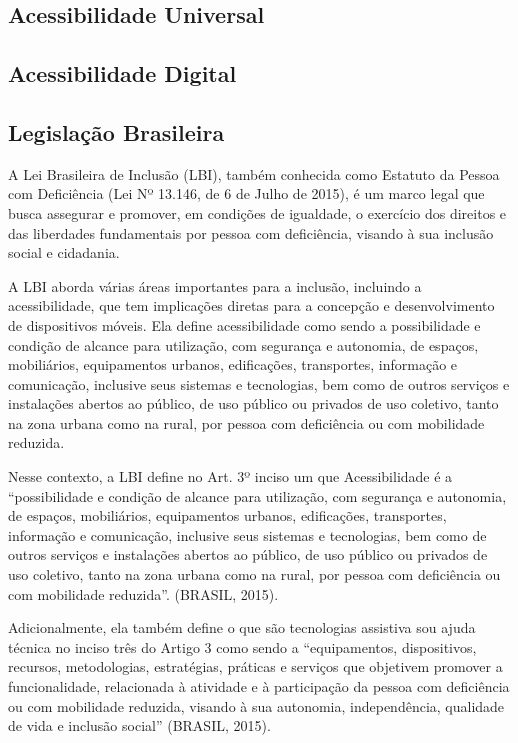 \subsection{Acessibilidade Universal}

\subsection{Acessibilidade Digital}

\subsection{Legislação Brasileira}

A Lei Brasileira de Inclusão (LBI), também conhecida como Estatuto da Pessoa com Deficiência (Lei Nº 13.146, de 6 de Julho de 2015), é um marco legal que busca assegurar e promover, em condições de igualdade, o exercício dos direitos e das liberdades fundamentais por pessoa com deficiência, visando à sua inclusão social e cidadania.

A LBI aborda várias áreas importantes para a inclusão, incluindo a acessibilidade, que tem implicações diretas para a concepção e desenvolvimento de dispositivos móveis. Ela define acessibilidade como sendo a possibilidade e condição de alcance para utilização, com segurança e autonomia, de espaços, mobiliários, equipamentos urbanos, edificações, transportes, informação e comunicação, inclusive seus sistemas e tecnologias, bem como de outros serviços e instalações abertos ao público, de uso público ou privados de uso coletivo, tanto na zona urbana como na rural, por pessoa com deficiência ou com mobilidade reduzida.

Nesse contexto, a LBI define no Art. 3º inciso um que Acessibilidade é a “possibilidade e condição de alcance para utilização, com segurança e autonomia, de espaços, mobiliários, equipamentos urbanos, edificações, transportes, informação e comunicação, inclusive seus sistemas e tecnologias, bem como de outros serviços e instalações abertos ao público, de uso público ou privados de uso coletivo, tanto na zona urbana como na rural, por pessoa com deficiência ou com mobilidade reduzida”. (BRASIL, 2015).

Adicionalmente, ela também define o que são tecnologias assistiva sou ajuda técnica no inciso três do Artigo 3 como sendo a “equipamentos, dispositivos, recursos, metodologias, estratégias, práticas e serviços que objetivem promover a funcionalidade, relacionada à atividade e à participação da pessoa com deficiência ou com mobilidade reduzida, visando à sua autonomia, independência, qualidade de vida e inclusão social” (BRASIL, 2015).

